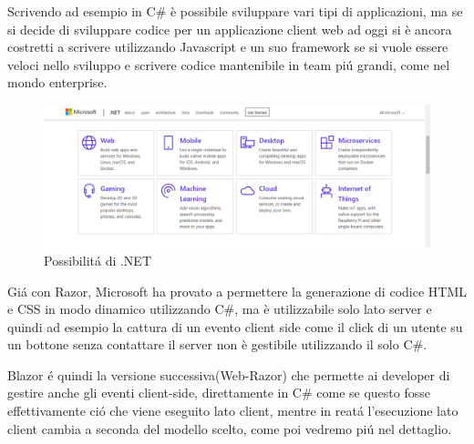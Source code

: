 Scrivendo ad esempio in C\# \`e possibile sviluppare vari tipi di applicazioni, ma se si decide di sviluppare codice per un applicazione client web ad oggi si \`e ancora costretti a scrivere utilizzando Javascript e un suo framework se si vuole essere veloci nello sviluppo e scrivere codice mantenibile in team pi\'u grandi, come nel mondo enterprise.

\begin{figure}[htbp]
\centerline{\includegraphics[scale=0.65]{figure/DotNetFrameworkCapabilities}}
\caption{Possibilit\'a di .NET}
\label{fig:DotNetCapabilities}
\end{figure}

Gi\'a con Razor\cite{razor}, Microsoft ha provato a permettere la generazione di codice HTML e CSS in modo dinamico utilizzando C\#, ma \`e utilizzabile solo lato server e quindi ad esempio la cattura di un evento client side come il click di un utente su un bottone senza contattare il server non \`e gestibile utilizzando il solo C\#.

Blazor \'e quindi la versione successiva(Web-Razor) che permette ai developer di gestire anche gli eventi client-side, direttamente in C\# come se questo fosse effettivamente ci\'o che viene eseguito lato client, mentre in reat\'a l'esecuzione lato client cambia a seconda del modello scelto, come poi vedremo pi\'u nel dettaglio.